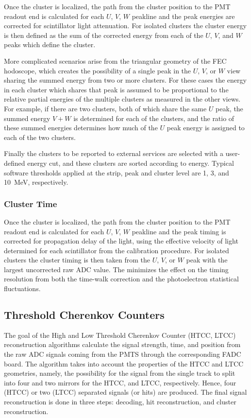 \documentclass[3p,times,twocolumn]{elsarticle}
\begin{document}
Once the cluster is localized, the path from the cluster position to the PMT readout end is calculated for each $U$, $V$,
$W$ peakline and the peak energies are corrected for scintillator light attenuation.  For isolated clusters the cluster energy
is then defined as the sum of the corrected energy from each of the $U$, $V$, and $W$ peaks which define the cluster.

More complicated scenarios arise from the triangular geometry of the FEC hodoscope, which creates the possibility of a
single peak in the $U$, $V$, or $W$ view sharing the summed energy from two or more clusters.  For these cases the energy
in each cluster which shares that peak is assumed to be proportional to the relative partial energies of the multiple clusters as
measured in the other views.  For example, if there are two clusters, both of which share the same $U$ peak, the summed
energy $V+W$ is determined for each of the clusters, and the ratio of these summed energies determines how much of the
$U$ peak energy is assigned to each of the two clusters.

Finally the clusters to be reported to external services are selected with a user-defined energy cut, and these clusters
are sorted according to energy. Typical software thresholds applied at the strip, peak and cluster level are 1, 3, and 10~MeV,
respectively.

\subsubsection {Cluster Time}

Once the cluster is localized, the path from the cluster position to the PMT readout end is calculated for each $U$, $V$,
$W$ peakline and the peak timing is corrected for propagation delay of the light, using the effective velocity of light
determined for each scintillator from the calibration procedure.  For isolated clusters the cluster timing is then taken from
the $U$, $V$, or $W$ peak with the largest uncorrected raw ADC value.  The minimizes the effect on the timing resolution
from both the time-walk correction and the photoelectron statistical fluctuations.

\subsection{Threshold Cherenkov Counters}

The goal of the High and Low Threshold Cherenkov Counter (HTCC, LTCC) reconstruction algorithms
calculate the signal strength, time, and position from the
raw ADC signals coming from the PMTS through the corresponding FADC board. The algorithm takes into account
the properties of the HTCC and LTCC geometries, namely, the possibility for the signal from the single track to split into
four and two mirrors for the HTCC, and LTCC, respectively.
Hence, four (HTCC) or two (LTCC) separated signals (or hits) are produced. The final signal reconstruction is done in three
steps: decoding, hit reconstruction, and cluster reconstruction.
\end{document}
